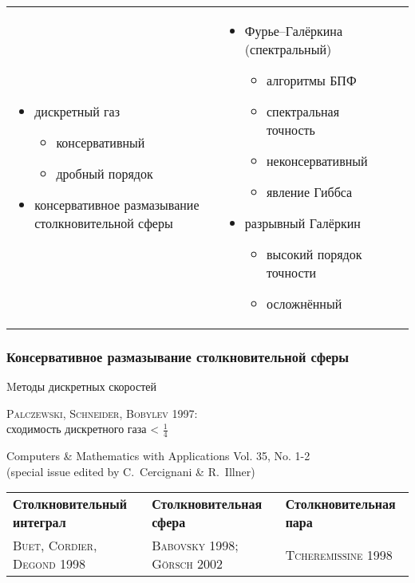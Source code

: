 \documentclass[mathserif]{beamer} %
\newcommand{\Cite}[2][]{\alert{\textsc{#2 #1}}}
\newcommand\pro{\item[$+$]}
\newcommand\con{\item[$-$]}
\begin{document}
\begin{frame}
\begin{adjustwidth}{-2.5em}{-2.5em}
\begin{tabular}{>{\centering\arraybackslash}p{\ColW}>{\centering\arraybackslash}p{\ColW}>{\centering\arraybackslash}p{\ColW}}
\begin{itemize}
            \item дискретный газ
            \begin{itemize}
                \pro консервативный
                \con дробный порядок
            \end{itemize}
            \item \alert{консервативное размазывание столкновительной сферы}
        \end{itemize} &
		\begin{itemize}
            \item Фурье--Галёркина (спектральный)
            \begin{itemize}
                \pro алгоритмы БПФ
                \pro спектральная точность
                \con неконсервативный
                \con явление Гиббса
            \end{itemize}
            \item разрывный Галёркин
            \begin{itemize}
                \pro высокий порядок точности
                \con осложнённый
            \end{itemize}
        \end{itemize} \\
	\end{tabular}
    \end{adjustwidth}
\end{frame}

\begin{frame}
    \frametitle{Консервативное размазывание столкновительной сферы}
    \centering
    {\Large Mетоды дискретных скоростей}\vspace{10pt}

    \Cite[1997]{Palczewski, Schneider, Bobylev}:\\
        сходимость дискретного газа < \(\frac14\) %
    \vspace{10pt}
    \setlength{\leftmarginii}{10pt}
    \setlength{\leftmarginiii}{\leftmarginii}
    \begin{adjustwidth}{-2.5em}{-2.5em}
    \centering
    Computers \& Mathematics with Applications Vol. 35, No. 1-2\\
    (special issue edited by C.~Cercignani \& R.~Illner) %

    \newcommand{\ColW}{}
    \begin{tabular}{>{\centering\arraybackslash}p{\ColW}>{\centering\arraybackslash}p{\ColW}>{\centering\arraybackslash}p{\ColW}}
		\centering\bfseries Столкновительный интеграл &
		\centering\bfseries Столкновительная сфера &
		{\centering\bfseries Столкновительная пара} \\
		\Cite[1998]{Buet, Cordier, Degond} &
		\Cite[1998]{Babovsky}; \Cite[2002]{G\"orsch} &
		\Cite[1998]{Tcheremissine} \\
	\end{tabular}
    \end{adjustwidth}
\end{frame}
\end{document}

